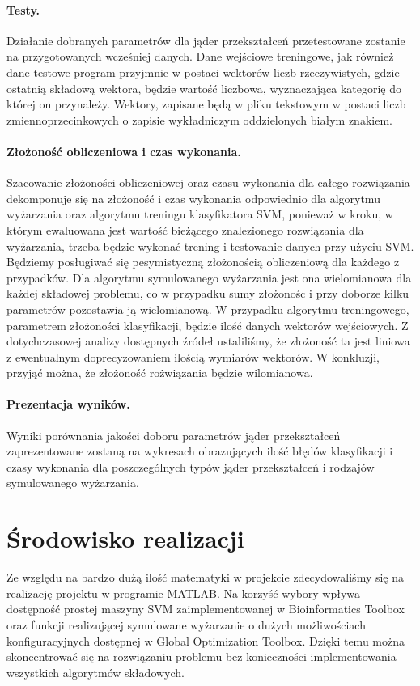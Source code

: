 \documentclass{article}
\begin{document}
\paragraph{Testy.}
Działanie dobranych parametrów dla jąder przekształceń przetestowane zostanie na przygotowanych wcześniej danych. Dane wejściowe treningowe, jak również dane testowe program przyjmnie w postaci wektorów liczb rzeczywistych, gdzie ostatnią składową wektora, będzie wartość liczbowa, wyznaczająca kategorię do której on przynależy. Wektory, zapisane będą w pliku tekstowym w postaci liczb zmiennoprzecinkowych o zapisie wykładniczym oddzielonych białym znakiem.
\paragraph{Złożoność obliczeniowa i czas wykonania.}
Szacowanie złożoności obliczeniowej oraz czasu wykonania dla całego rozwiązania dekomponuje się na złożoność i czas wykonania odpowiednio dla algorytmu wyżarzania oraz  algorytmu treningu klasyfikatora SVM, ponieważ w kroku, w którym ewaluowana jest wartość bieżącego znalezionego rozwiązania dla wyżarzania, trzeba będzie wykonać trening i testowanie danych przy użyciu SVM.
Będziemy posługiwać się pesymistyczną złożonością obliczeniową dla każdego z przypadków. Dla algorytmu symulowanego wyżarzania jest ona wielomianowa dla każdej składowej problemu, co w przypadku sumy złożonośc i przy doborze kilku parametrów pozostawia ją wielomianową. W przypadku algorytmu treningowego, parametrem złożoności klasyfikacji, będzie ilość danych wektorów wejściowych. Z dotychczasowej analizy dostępnych źródeł ustaliliśmy, że złożoność ta jest liniowa z ewentualnym doprecyzowaniem ilością wymiarów wektorów. W konkluzji, przyjąć można, że złożoność rożwiązania będzie wilomianowa.
\paragraph{Prezentacja wyników.}
Wyniki porównania jakości doboru parametrów jąder przekształceń zaprezentowane zostaną na wykresach obrazujących ilość błędów klasyfikacji i czasy wykonania dla poszczególnych typów jąder przekształceń i rodzajów symulowanego wyżarzania. 
\section{Środowisko realizacji}
Ze względu na bardzo dużą ilość matematyki w projekcie zdecydowaliśmy się na realizację projektu w programie MATLAB. Na korzyść wybory wpływa dostępność prostej maszyny SVM zaimplementowanej w Bioinformatics Toolbox oraz funkcji realizującej symulowane wyżarzanie o dużych możliwościach konfiguracyjnych dostępnej w Global Optimization Toolbox. Dzięki temu można skoncentrować się na rozwiązaniu problemu bez konieczności implementowania wszystkich algorytmów składowych.
\end{document}
